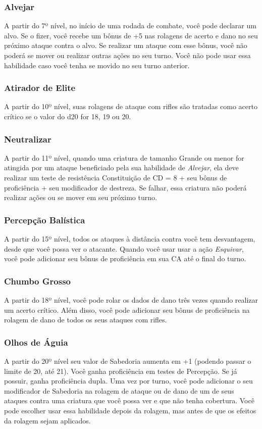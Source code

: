 \documentclass[letterpaper,twocolumn,openany]{dndbook}
\begin{document}
	\subsubsection{Alvejar}
	A partir do 7º nível, no início de uma rodada de combate, você pode declarar um alvo. Se o fizer, você recebe um bônus de +5 nas rolagens de acerto e dano no seu próximo ataque contra o alvo. Se realizar um ataque com esse bônus, você não poderá se mover ou realizar outras ações no seu turno. Você não pode usar essa habilidade caso você tenha se movido no seu turno anterior.
	
	\subsubsection{Atirador de Elite}
	A partir do 10º nível, suas rolagens de ataque com rifles são tratadas como acerto crítico se o valor do d20 for 18, 19 ou 20.
	
	\subsubsection{Neutralizar}
	A partir do 11º nível, quando uma criatura de tamanho Grande ou menor for atingida por um ataque beneficiado pela sua habilidade de \textit{Alvejar}, ela deve realizar um teste de resistência Constituição de CD = 8 + seu bônus de proficiência + seu modificador de destreza. Se falhar, essa criatura não poderá realizar ações ou se mover em seu próximo turno.
	
	\subsubsection{Percepção Balística}
	A partir do 15º nível, todos os ataques à distância contra você tem desvantagem, desde que você possa ver o atacante. Quando você usar usar a ação \textit{Esquivar}, você pode adicionar seu bônus de proficiência em sua CA até o final do turno.
	
	\subsubsection{Chumbo Grosso}
	A partir do 18º nível, você pode rolar os dados de dano três vezes quando realizar um acerto crítico. Além disso, você pode adicionar seu bônus de proficiência na rolagem de dano de todos os seus ataques com rifles.
	
	\subsubsection{Olhos de Águia}
	A partir do 20º nível seu valor de Sabedoria aumenta em +1 (podendo passar o limite de 20, até 21).
	Você ganha proficiência em testes de Percepção. Se já possuir, ganha proficiência dupla.
	Uma vez por turno, você pode adicionar o seu modificador de Sabedoria na rolagem de ataque ou de dano de um de seus ataques contra uma criatura que você possa ver e que não tenha cobertura.
	Você pode escolher usar essa habilidade depois da rolagem, mas antes de que os efeitos da rolagem sejam aplicados.
	
	
\end{document}
